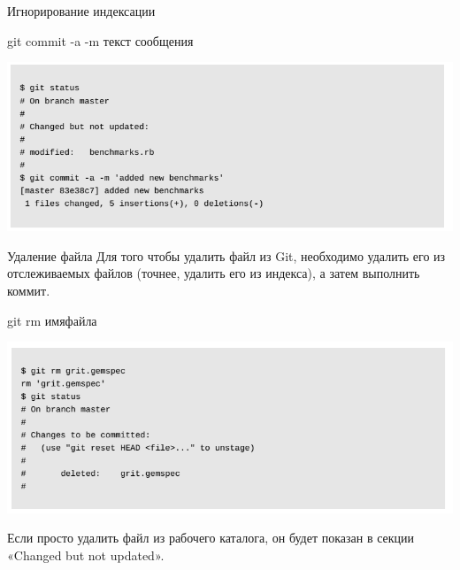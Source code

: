 \documentclass{beamer}
\begin{document}
\begin{frame}{Игнорирование индексации}
\begin{block}{git commit -a -m текст сообщения}
\begin{center}
\includegraphics[scale=0.5]{images/commit-3.png}
\end{center}
\end{block}
\end{frame}

\begin{frame}{Удаление файла}
Для того чтобы удалить файл из Git, необходимо удалить его из отслеживаемых файлов (точнее, удалить его из индекса), а затем выполнить коммит. 
\begin{block}{git rm имяфайла}
\begin{center}
\includegraphics[scale=0.5]{images/rm-2.png}
\end{center}
\end{block}
Если просто удалить файл из рабочего каталога, он будет показан в секции
«Changed but not updated».
\end{frame}
\end{document}
